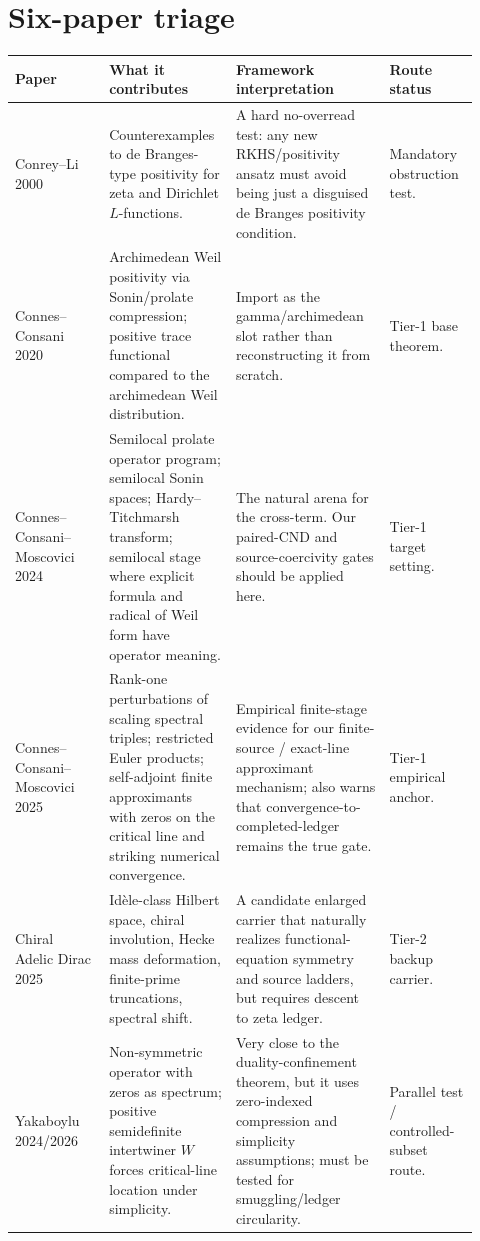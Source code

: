 \documentclass[11pt]{article}
\begin{document}
\section*{Six-paper triage}
\begin{longtable}{p{0.19\linewidth}p{0.24\linewidth}p{0.31\linewidth}p{0.18\linewidth}}
\toprule
Paper & What it contributes & Framework interpretation & Route status\\
\midrule
Conrey--Li 2000 & Counterexamples to de Branges-type positivity for zeta and Dirichlet $L$-functions. & A hard no-overread test: any new RKHS/positivity ansatz must avoid being just a disguised de Branges positivity condition. & Mandatory obstruction test.\\
Connes--Consani 2020 & Archimedean Weil positivity via Sonin/prolate compression; positive trace functional compared to the archimedean Weil distribution. & Import as the gamma/archimedean slot rather than reconstructing it from scratch. & Tier-1 base theorem.\\
Connes--Consani--Moscovici 2024 & Semilocal prolate operator program; semilocal Sonin spaces; Hardy--Titchmarsh transform; semilocal stage where explicit formula and radical of Weil form have operator meaning. & The natural arena for the cross-term.  Our paired-CND and source-coercivity gates should be applied here. & Tier-1 target setting.\\
Connes--Consani--Moscovici 2025 & Rank-one perturbations of scaling spectral triples; restricted Euler products; self-adjoint finite approximants with zeros on the critical line and striking numerical convergence. & Empirical finite-stage evidence for our finite-source / exact-line approximant mechanism; also warns that convergence-to-completed-ledger remains the true gate. & Tier-1 empirical anchor.\\
Chiral Adelic Dirac 2025 & Idèle-class Hilbert space, chiral involution, Hecke mass deformation, finite-prime truncations, spectral shift. & A candidate enlarged carrier that naturally realizes functional-equation symmetry and source ladders, but requires descent to zeta ledger. & Tier-2 backup carrier.\\
Yakaboylu 2024/2026 & Non-symmetric operator with zeros as spectrum; positive semidefinite intertwiner $W$ forces critical-line location under simplicity. & Very close to the duality-confinement theorem, but it uses zero-indexed compression and simplicity assumptions; must be tested for smuggling/ledger circularity. & Parallel test / controlled-subset route.\\
\bottomrule
\end{longtable}
\end{document}

